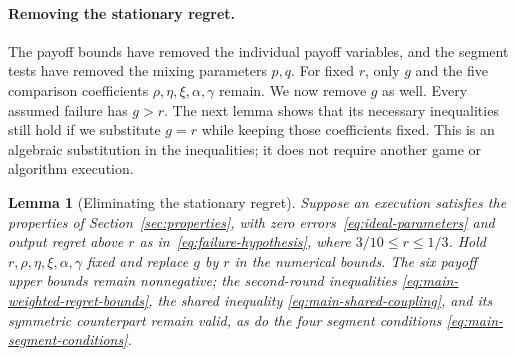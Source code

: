 \documentclass[11pt]{article}
\newtheorem{lemma}[theorem]{Lemma}
\theoremstyle{remark}
\theoremstyle{plain}
\begin{document}
\paragraph{Removing the stationary regret.}
The payoff bounds have removed the individual payoff variables, and
the segment tests have removed the mixing parameters $p,q$. For
fixed $r$, only $g$ and the five comparison coefficients
$\rho,\eta,\xi,\alpha,\gamma$ remain. We now remove $g$ as well.
Every assumed failure has $g>r$. The next lemma shows that its
necessary inequalities still hold if we substitute $g=r$ while
keeping those coefficients fixed. This is an algebraic substitution
in the inequalities; it does not require another game or algorithm
execution.

\begin{lemma}[Eliminating the stationary regret]
\label{lem:main-g-projection}
Suppose an execution satisfies the properties of
Section~\ref{sec:properties}, with zero errors~\eqref{eq:ideal-parameters}
and output regret above $r$ as in~\eqref{eq:failure-hypothesis},
where $3/10\le r\le1/3$.
Hold $r,\rho,\eta,\xi,\alpha,\gamma$ fixed and replace $g$ by $r$
in the numerical bounds. The six payoff upper bounds remain
nonnegative; the second-round inequalities
\eqref{eq:main-weighted-regret-bounds}, the shared inequality
\eqref{eq:main-shared-coupling}, and its symmetric counterpart
remain valid, as do the four segment conditions
\eqref{eq:main-segment-conditions}.
\end{lemma}
\end{document}
